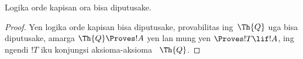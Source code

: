 \documentclass[../../../include/open-logic-section]{subfiles}
\begin{document}
\begin{cor}
Logika orde kapisan ora bisa diputusake.
\end{cor}

\begin{proof}
Yen logika orde kapisan bisa diputusake, provabilitas ing~$\Th{Q}$
uga bisa diputusake, amarga $\Th{Q} \Proves !A$ yen lan mung yen
$\Proves !T \lif !A$, ing ngendi $!T$ iku konjungsi aksioma-aksioma
~$\Th{Q}$.
\end{proof}
\end{document}

